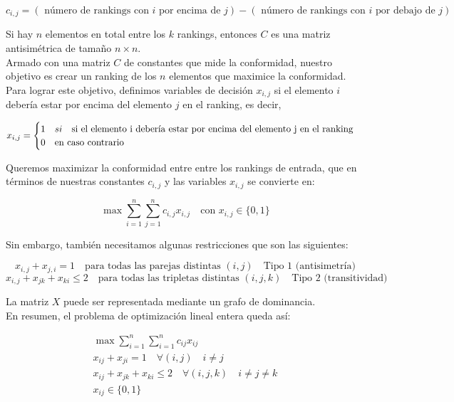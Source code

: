  \[ c_{i,j} = (\text{ número de rankings con } i \text{ por encima de } j ) - (\text{ número de rankings con } i \text{ por debajo de } j ) \]
 
 Si hay $n$ elementos en total entre los $k$ rankings, entonces $C$ es una matriz antisimétrica de tamaño $n \times n$.\\
 
 Armado con una matriz $C$ de constantes que mide la conformidad, nuestro objetivo es crear un ranking de los $n$ elementos que maximice la conformidad. Para lograr este objetivo, definimos variables de decisión $x_{i,j}$ si el elemento $i$ debería estar por encima del elemento $j$ en el ranking, es decir, 
 
 \[ x_{i,j} = \begin{cases}
 1 \quad si \quad \text{si el elemento } $i$ \text{ debería estar por encima del elemento }  $j$ \text{ en el ranking}\\
 0 \quad \text{en caso contrario}
 \end{cases} \]
 
 Queremos maximizar la conformidad entre entre los rankings de entrada, que en términos de nuestras constantes $c_{i,j}$ y las variables $x_{i,j}$ se convierte en:
 
 \[ \max \sum\limits_{i=1}^{n} \sum\limits_{j=1}^{n} c_{i,j} x_{i,j} \quad \text{con } x_{i,j} \in \{0,1\} \] 
 
 Sin embargo, también necesitamos algunas restricciones que son las siguientes:
 
 \[ x_{i,j} + x_{j,i} = 1 \quad \text{para todas las parejas distintas } (i,j)  \quad \text{Tipo 1 (antisimetría)}\]
 \[x_{i,j} + x_{jk} + x_{ki} \leq 2 \quad \text{para todas las tripletas distintas } (i,j,k)  \quad \text{Tipo 2 (transitividad)}
 \]
 
 La matriz $X$ puede ser representada mediante un grafo de dominancia.\\
 
 En resumen, el problema de optimización lineal entera queda así:
 
 \begin{align*}
 \max \sum\limits_{i=1}^{n} \sum\limits_{i=1}^{n} c_{ij} x_{ij} \\
 x_{ij} + x_{ji} = 1 \quad \forall (i,j) \quad i \neq j \\
 x_{ij} + x_{jk} + x_{ki} \leq 2 \quad \forall (i,j,k) \quad i \neq j \neq k\\
 x_{ij} \in \{0,1\}
 \end{align*}
 
